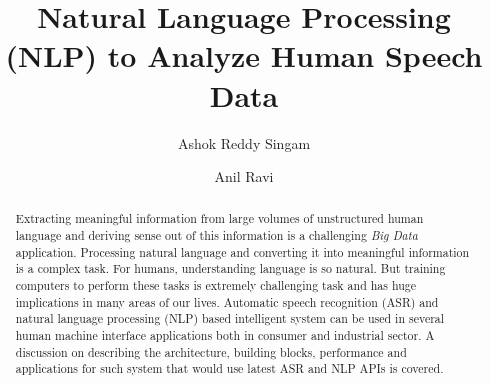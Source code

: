 \documentclass[sigconf]{acmart}
\begin{document}
\title{Natural Language Processing (NLP) to Analyze Human Speech Data}

\author{Ashok Reddy Singam}

\author{Anil Ravi}

\begin{abstract}
Extracting meaningful information from large volumes of unstructured human language and deriving sense out of this information is a challenging \textit{Big Data} application. Processing natural language and converting it into meaningful information is a complex task. For humans, understanding language is so natural. But training computers to perform these tasks is extremely challenging task and has huge implications in many areas of our lives. Automatic speech recognition (ASR) and natural language processing (NLP) based intelligent system can be  used in several human machine interface applications both in consumer and industrial sector. A discussion on describing the architecture, building blocks, performance and applications for such system that would use latest ASR and NLP APIs is covered.
\end{abstract}


\maketitle
\end{document}
